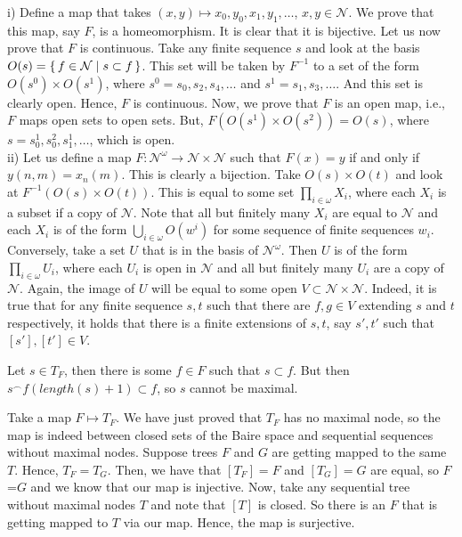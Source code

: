 \documentclass[12pt]{article}
\theoremstyle{definition}
\newenvironment{customthm}[1]
  {\renewcommand\theinnercustomthm{#1}\innercustomthm}
  {\endinnercustomthm}
\begin{document}
\begin{customthm}{I.4.17}
    i) Define a map that takes $(x,y) \mapsto x_0, y_0, x_1, y_1, \ldots$, $x,y \in \mathcal{N}$. We prove that this map, say $F$, is a homeomorphism. It is clear that it is bijective. Let us now prove that $F$ is continuous. Take any finite sequence $s$ and look at the basis $O(s) = \{\,{f \in \mathcal{N} \mid s \subset f}\,\}$. This set will be taken by $F^{-1}$ to a set of the form $O(s^0) \times O(s^1)$, where $s^0 = s_0, s_2, s_4,\ldots$ and $s^1 = s_1, s_3, \ldots$. And this set is clearly open. Hence, $F$ is continuous. Now, we prove that $F$ is an open map, i.e., $F$ maps open sets to open sets. But, $F(O(s^1) \times O(s^2)) = O(s)$, where $s = s^1_0, s^2_0, s^1_1, \ldots$, which is open. \\
    ii) Let us define a map $F \colon \mathcal{N}^\omega \to \mathcal{N} \times \mathcal{N}$ such that $F(x) = y$ if and only if $y(n,m) = x_n(m)$. This is clearly a bijection. Take $O(s) \times O(t)$ and look at $F^{-1}(O(s) \times O(t))$. This is equal to some set $\prod_{i \in \omega} X_i$, where each $X_i$ is a subset if a copy of $\mathcal{N}$. Note that all but finitely many $X_i$ are equal to $\mathcal{N}$ and each $X_i$ is of the form $\bigcup_{i \in \omega} O(w^i)$ for some sequence of finite sequences $w_i$. Conversely, take a set $U$ that is in the basis of $\mathcal{N}^\omega$. Then $U$ is of the form $\prod_{i \in \omega} U_i$, where each $U_i$ is open in $\mathcal{N}$ and all but finitely many $U_i$ are a copy of $\mathcal{N}$. Again, the image of $U$ will be equal to some open $V \subset \mathcal{N} \times \mathcal{N}$. Indeed, it is true that for any finite sequence $s, t$ such that there are $f,g \in V$ extending $s$ and $t$ respectively, it holds that there is a finite extensions of $s,t$, say $s',t'$ such that $[s'], [t'] \in V$.
\end{customthm}

\begin{customthm}{I.4.18}
    Let $s \in T_F$, then there is some $f \in F$ such that $s \subset f$. But then $s^\frown f(length(s)+1) \subset f$, so $s$ cannot be maximal.
    
    Take a map $F \mapsto T_F$. We have just proved that $T_F$ has no maximal node, so the map is indeed between closed sets of the Baire space and sequential sequences without maximal nodes. Suppose trees $F$ and $G$ are getting mapped to the same $T$. Hence, $T_F = T_G$. Then, we have that $[T_F]=F$ and $[T_G]=G$ are equal, so $F$=$G$ and we know that our map is injective. Now, take any sequential tree without maximal nodes $T$ and note that $[T]$ is closed. So there is an $F$ that is getting mapped to $T$ via our map. Hence, the map is surjective.
\end{customthm}
\end{document}
